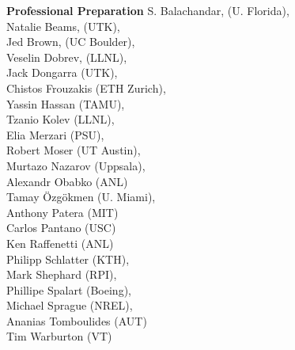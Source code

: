 \documentclass[11pt,letterpaper,english]{article}
\begin{document}
\begin{flushleft} {\bf Professional Preparation}
{ S. Balachandar, (U. Florida), \\
 Natalie Beams, (UTK), \\
 Jed Brown, (UC Boulder), \\
 Veselin Dobrev, (LLNL), \\
 Jack Dongarra  (UTK), \\
 Chistos Frouzakis (ETH Zurich), \\
 Yassin Hassan (TAMU),  \\
 Tzanio Kolev (LLNL),  \\
 Elia Merzari (PSU), \\
 Robert Moser (UT Austin), \\
 Murtazo Nazarov (Uppsala), \\
Alexandr Obabko (ANL) \\
 Tamay \"Ozg\"okmen (U. Miami),  \\
Anthony Patera (MIT) \\
Carlos Pantano (USC) \\
Ken Raffenetti (ANL) \\
 Philipp Schlatter (KTH), \\
 Mark Shephard     (RPI), \\
 Phillipe Spalart (Boeing), \\
 Michael Sprague (NREL), \\
Ananias Tomboulides (AUT) \\
 Tim Warburton (VT) \\
 }


\end{flushleft}
\end{document}
